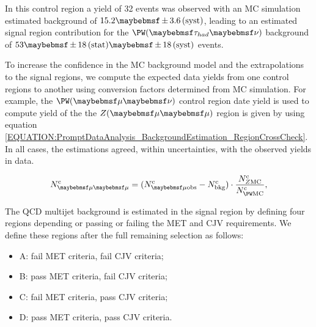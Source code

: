 In this control region a yield of 32 events was observed with an \gls{MC} simulation estimated background of $15.2 \pm 3.6\syst$, leading to an estimated signal region contribution for the $\PW (\tau_{had} \nu)$ background of $53 \pm 18\stat \pm 18\syst$ events.

To increase the confidence in the \gls{MC} background model and the extrapolations to the signal regions, we compute the expected data yields from one control regions to another using conversion factors determined from \gls{MC} simulation. For example, the $\PW (\mu \nu)$ control region date yield is used to compute yield of the the $\Z (\mu \mu)$ region is given by using equation \ref{EQUATION:PromptDataAnalysis_BackgroundEstimation_RegionCrossCheck}. In all cases, the estimations agreed, within uncertainties, with the observed yields in data. 

\begin{equation}
N^\mathrm{c}_{\mu \mu} = (N^\mathrm{c}_{\mu \text{obs}} - N^\mathrm{c}_\text{bkg}) \cdot \frac{N^\mathrm{c}_{\Z \mathrm{MC}}}{N^\mathrm{c}_{\PW \mathrm{MC}}},
\label{EQUATION:PromptDataAnalysis_BackgroundEstimation_RegionCrossCheck}
\end{equation}

The \gls{QCD} multijet background is estimated in the signal region by defining four regions depending or passing or failing the \gls{MET} and \gls{CJV} requirements. We define these regions after the full remaining selection as follows:

\begin{itemize}
  \item{A: fail \gls{MET} criteria, fail \gls{CJV} criteria;}
  \item{B: pass \gls{MET} criteria, fail \gls{CJV} criteria;}
  \item{C: fail \gls{MET} criteria, pass \gls{CJV} criteria;}
  \item{D: pass \gls{MET} criteria, pass \gls{CJV} criteria.}
\end{itemize}

